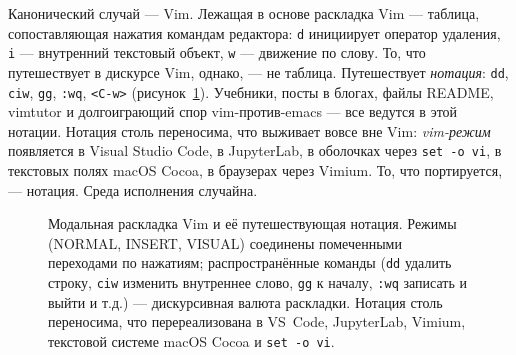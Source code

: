 \documentclass[10pt,letterpaper,twocolumn]{article}
\begin{document}
Канонический случай --- Vim. Лежащая в основе раскладка Vim --- таблица, сопоставляющая нажатия командам редактора: \texttt{d} инициирует оператор удаления, \texttt{i} --- внутренний текстовый объект, \texttt{w} --- движение по слову. То, что путешествует в дискурсе Vim, однако, --- не таблица. Путешествует \emph{нотация}: \texttt{dd}, \texttt{ciw}, \texttt{gg}, \texttt{:wq}, \texttt{<C-w>} (рисунок~\ref{fig:vim-modes}). Учебники, посты в блогах, файлы README, vimtutor и долгоиграющий спор vim-против-emacs --- все ведутся в этой нотации. Нотация столь переносима, что выживает вовсе вне Vim: \emph{vim-режим} появляется в Visual Studio Code, в JupyterLab, в оболочках через \texttt{set -o vi}, в текстовых полях macOS Cocoa, в браузерах через Vimium. То, что портируется, --- нотация. Среда исполнения случайна.

\begin{figure}[t]
\centering
{}
\caption{Модальная раскладка Vim и её путешествующая нотация. Режимы (NORMAL, INSERT, VISUAL) соединены помеченными переходами по нажатиям; распространённые команды (\texttt{dd} удалить строку, \texttt{ciw} изменить внутреннее слово, \texttt{gg} к началу, \texttt{:wq} записать и выйти и т.д.) --- дискурсивная валюта раскладки. Нотация столь переносима, что перереализована в VS~Code, JupyterLab, Vimium, текстовой системе macOS Cocoa и \texttt{set -o vi}.}
\label{fig:vim-modes}
\end{figure}
\end{document}
